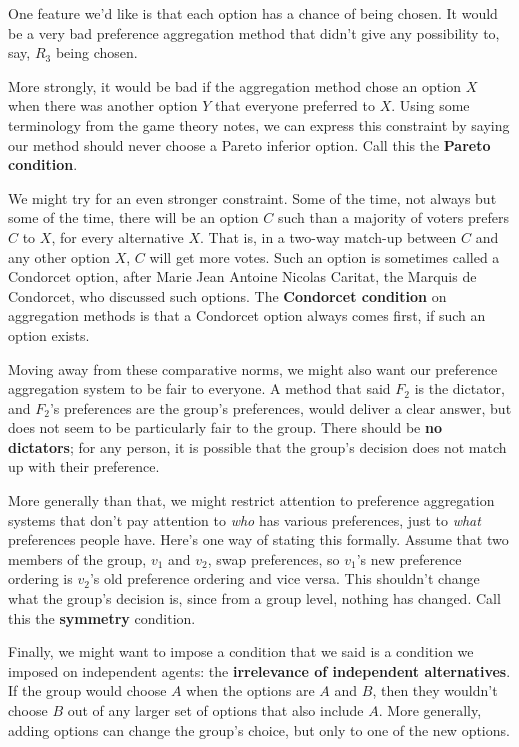 \begin{multicols}{2}
One feature we'd like is that each option has a chance of being chosen. It would be a very bad preference aggregation method that didn't give any possibility to, say, $R_3$ being chosen.

More strongly, it would be bad if the aggregation method chose an option $X$ when there was another option $Y$ that everyone preferred to $X$. Using some terminology from the game theory notes, we can express this constraint by saying our method should never choose a Pareto inferior option. Call this the \textbf{Pareto condition}.

We might try for an even stronger constraint. Some of the time, not always but some of the time, there will be an option $C$ such than a majority of voters prefers $C$ to $X$, for every alternative $X$. That is, in a two-way match-up between $C$ and any other option $X$, $C$ will get more votes. Such an option is sometimes called a Condorcet option, after Marie Jean Antoine Nicolas Caritat, the Marquis de Condorcet, who discussed such options. The \textbf{Condorcet condition} on aggregation methods is that a Condorcet option always comes first, if such an option exists.

Moving away from these comparative norms, we might also want our preference aggregation system to be fair to everyone. A method that said $F_2$ is the dictator, and $F_2$'s preferences are the group's preferences, would deliver a clear answer, but does not seem to be particularly fair to the group. There should be \textbf{no dictators}; for any person, it is possible that the group's decision does not match up with their preference.

More generally than that, we might restrict attention to preference aggregation systems that don't pay attention to \textit{who} has various preferences, just to \textit{what} preferences people have. Here's one way of stating this formally. Assume that two members of the group, $v_1$ and $v_2$, swap preferences, so $v_1$'s new preference ordering is $v_2$'s old preference ordering and vice versa. This shouldn't change what the group's decision is, since from a group level, nothing has changed. Call this the \textbf{symmetry} condition.

Finally, we might want to impose a condition that we said is a condition we imposed on independent agents: the \textbf{irrelevance of independent alternatives}. If the group would choose $A$ when the options are $A$ and $B$, then they wouldn't choose $B$ out of any larger set of options that also include $A$. More generally, adding options can change the group's choice, but only to one of the new options.


\end{multicols}
